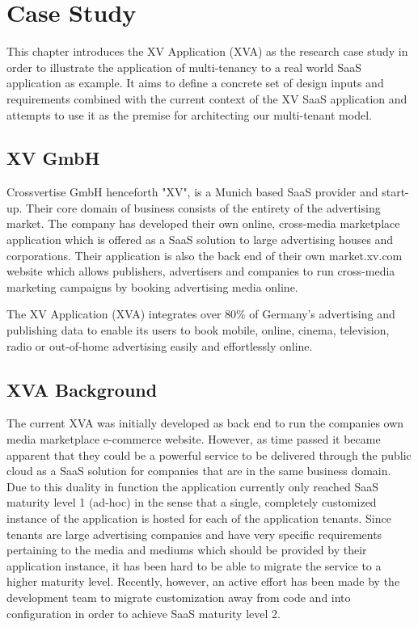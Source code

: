 \chapter{Case Study}

This chapter introduces the XV Application (XVA) as the research case study in order to illustrate the application of multi-tenancy  to a real world SaaS  application as example. It aims to define a concrete set of design inputs and requirements combined with the current context of the XV SaaS application and attempts to use it as the premise for architecting our multi-tenant model. 


\section{XV GmbH}

Crossvertise GmbH henceforth "XV", is a Munich based SaaS provider and start-up. Their core domain of business consists of the entirety of the advertising market. The company has developed their own online, cross-media marketplace application which is offered as a SaaS solution to large advertising houses and corporations. Their application is also the back end of their own market.xv.com website which allows publishers, advertisers and companies to run cross-media marketing campaigns by booking advertising media online.
 
The XV Application (XVA) integrates over 80\% of Germany's advertising and publishing data to enable its users to book mobile, online, cinema, television, radio or out-of-home advertising easily and effortlessly online.



\section{XVA Background}

The current XVA was initially developed as back end to run the companies own media marketplace e-commerce website. However, as time passed it became apparent that they could be a powerful service to be delivered through the public cloud as a SaaS solution for companies that are in the same business domain. Due to this duality in function the application currently only reached SaaS maturity  level 1 (ad-hoc) \cite{Chong2006} in the sense that a single, completely customized instance of the application is hosted for each of the application tenants. Since tenants are large advertising companies and have very specific requirements pertaining to the media and mediums which should be provided by their application instance, it has been hard to be able to migrate the service to a higher maturity level. Recently, however, an active effort has been made by the development team to migrate customization away from code and into configuration in order to achieve SaaS maturity level 2.
 

